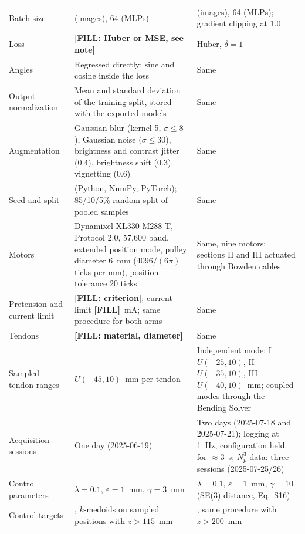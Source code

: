 \begin{table}[h]
\begin{tabular}{>{\raggedright\arraybackslash}p{2.8cm} >{\raggedright\arraybackslash}p{6.2cm} >{\raggedright\arraybackslash}p{6.2cm}}
Batch size & 16 (images), 64 (MLPs) & 16 (images), 64 (MLPs); gradient clipping at 1.0 \\
Loss & \textbf{[FILL: Huber or MSE, see note]} & Huber, $\delta = 1$ \\
Angles & Regressed directly; sine and cosine inside the loss & Same \\
Output normalization & Mean and standard deviation of the training split, stored with the exported models & Same \\
Augmentation & Gaussian blur (kernel 5, $\sigma \le 8$), Gaussian noise ($\sigma \le 30$), brightness and contrast jitter (0.4), brightness shift (0.3), vignetting (0.6) & Same \\
Seed and split & 42 (Python, NumPy, PyTorch); 85/10/5\% random split of pooled samples & Same \\
Motors & Dynamixel XL330-M288-T, Protocol 2.0, 57,600 baud, extended position mode, pulley diameter 6~mm ($4096 / (6\pi)$ ticks per mm), position tolerance 20 ticks & Same, nine motors; sections II and III actuated through Bowden cables \\
Pretension and current limit & \textbf{[FILL: criterion]}; current limit \textbf{[FILL]}~mA; same procedure for both arms & Same \\
Tendons & \textbf{[FILL: material, diameter]} & Same \\
Sampled tendon ranges & $U(-45, 10)$~mm per tendon & Independent mode: I $U(-25, 10)$, II $U(-35, 10)$, III $U(-40, 10)$~mm; coupled modes through the Bending Solver \\
Acquisition sessions & One day (2025-06-19) & Two days (2025-07-18 and 2025-07-21); logging at 1~Hz, configuration held for $\approx 3$~s; $N_p^3$ data: three sessions (2025-07-25/26) \\
Control parameters & $\lambda = 0.1$, $\varepsilon = 1$~mm, $\gamma = 3$~mm & $\lambda = 0.1$, $\varepsilon = 1$~mm, $\gamma = 10$ (SE(3) distance, Eq.~S16) \\
Control targets & 20, $k$-medoids on sampled positions with $z > 115$~mm & 20, same procedure with $z > 200$~mm \\
\bottomrule
\end{tabular}
\end{table}
